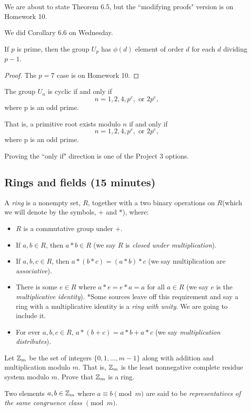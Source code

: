 \documentclass[letterpaper, 11 pt]{article}
\begin{document}
We are about to state Theorem 6.5, but the ``modifying proofs" version is on Homework 10.

We did Corollary 6.6 on Wednesday.


\begin{thm}[Theorem 6.5]
 If $p$ is prime, then the group $U_p$ has $\phi(d)$ element of order $d$ for each $d$ dividing $p-1$.
\end{thm}
\begin{proof}
 The $p=7$ case is on Homework 10.
\end{proof}

\begin{thm}[Theorem 6.11]
The group $U_n$ is cyclic if and only if \[n=1,2,4,p^e,\textrm{ or } 2p^e,\]
where p is an odd prime.

That is, a primitive root exists modulo $n$ if and only if \[n=1,2,4,p^e,\textrm{ or } 2p^e,\]
where p is an odd prime.
\end{thm}

Proving the ``only if" direction is one of the Project 3 options.

\subsection{Rings and fields (15 minutes)}
\begin{defn}
 A \emph{ring} is a nonempty set, $R$, together with a two binary operations on $R$(which we will denote by the symbols, $+$ and $*$), where:
\begin{itemize}
\item $R$ is a commutative group under $+$.
 \item If $a,b\in R$, then $a*b\in R$ (we say $R$ is \emph{closed under multiplication}).
 \item If $a,b, c\in R$, then $a*(b*c)=(a*b)*c$ (we say multiplication are \emph{associative}).
 \item There is some $e\in R$ where $a*e=e*a=a$ for all $a\in R$ (we say $e$ is the \emph{multiplicative identity}). *Some sources leave off this requirement and say a ring with a multiplicative identity is a \emph{ring with unity}. We are going to include it.
 \item For ever $a,b,c\in R$, $a*(b+c)=a*b+a*c$ (we say \emph{multiplication distributes}).
\end{itemize}
\end{defn}

\begin{br}[5 minutes] Let $\mathbb Z_m$ be the set of integers $\{0,1,\dots,m-1\}$ along with addition and multiplication modulo $m$. That is, $\mathbb Z_m$ is the least nonnegative complete residue system modulo $m$.  Prove that $\mathbb Z_m$ is a ring. 

Two elements $a,b\in \mathbb Z_m$ where $a\equiv b \pmod m$ are said to be \emph{representatives of the same congruence class $\pmod m$}.
\end{br}
\end{document}
